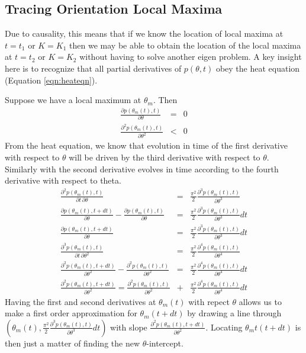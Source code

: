 \documentclass{article}
\begin{document}
\subsection{Tracing Orientation Local Maxima}
Due to causality, this means that if we know the location of local maxima at $ t = t_1 $ or $ K = K_1 $ then we may be able to obtain the location of the local maxima at $ t = t_2 $ or $ K = K_2 $ without having to solve another eigen problem. A key insight here is to recognize that all partial derivatives of $ p(\theta,t) $ obey the heat equation (Equation \ref{eqn:heateqn}).

Suppose we have a local maximum at $ \theta_m $. Then
\begin{eqnarray}
	\frac{\partial p(\theta_m(t),t)}{\partial \theta} & = & 0 \\
	\frac{\partial^2 p(\theta_m(t),t)}{\partial \theta^2} & < & 0 
\end{eqnarray}
From the heat equation, we know that evolution in time of the first derivative with respect to $ \theta $ will be driven by the third derivative with respect to $ \theta $. Similarly with the second derivative evolves in time according to the fourth derivative with respect to theta.
\begin{eqnarray}
	\frac{\partial^2 p(\theta_m(t),t)}{\partial t \, \partial \theta} & = & \frac{\pi^2}{2} \frac{\partial^3 p(\theta_m(t),t)}{\partial \theta^3} \\
	\frac{\partial p(\theta_m(t),t+dt)}{\partial \theta} - \frac{\partial p(\theta_m(t),t)}{\partial \theta} & = & \frac{\pi^2}{2} \frac{\partial^3 p(\theta_m(t),t)}{\partial \theta^3} dt \\
	\frac{\partial p(\theta_m(t),t+dt)}{\partial \theta} & = & \frac{\pi^2}{2} \frac{\partial^3 p(\theta_m(t),t)}{\partial \theta^3} dt \\
	\frac{\partial^3 p(\theta_m(t),t)}{\partial t \, \partial \theta^2} & = & \frac{\pi^2}{2} \frac{\partial^4 p(\theta_m(t),t)}{\partial \theta^4}  \\
	\frac{\partial^2 p(\theta_m(t),t+dt)}{\partial \theta^2} - \frac{\partial^2 p(\theta_m(t),t)}{\partial \theta^2} & = & \frac{\pi^2}{2} \frac{\partial^4 p(\theta_m(t),t)}{\partial \theta^4} dt \\
	\frac{\partial^2 p(\theta_m(t),t+dt)}{\partial \theta^2} =  \frac{\partial^2 p(\theta_m(t),t)}{\partial \theta^2} & + & \frac{\pi^2}{2} \frac{\partial^4 p(\theta_m(t),t)}{\partial \theta^4} dt
\end{eqnarray}
Having the first and second derivatives at $ \theta_m(t) $ with repect $ \theta $ allows us to make a first order approximation for $ \theta_m(t+dt) $ by drawing a line through $ ( \theta_m(t) , \frac{\pi^2}{2} \frac{\partial^3 p(\theta_m(t),t)}{\partial \theta^3} dt ) $ with slope $ \frac{\partial^2 p(\theta_m(t),t+dt)}{\partial \theta^2} $. Locating $ \theta_mt(t+dt) $ is then just a matter of finding the new $\theta$-intercept.
\end{document}
